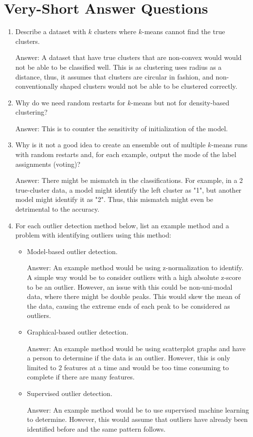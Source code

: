 \documentclass{article}
\def\ans#1{\par\gre{Answer: #1}}
\def\gre#1{{\color{gre}#1}}
\begin{document}
\pagebreak

\section{Very-Short Answer Questions}



\begin{enumerate}
\item Describe a dataset with $k$ clusters where $k$-means cannot find the true clusters.
\ans{A dataset that have true clusters that are non-convex would would not be able to be classified well. This is as clustering uses radius as a distance, thus, it assumes that clusters are circular in fashion, and non-conventionally shaped clusters would not be able to be clustered correctly.}
\item Why do we need random restarts for $k$-means but not for density-based clustering?
\ans{This is to counter the sensitivity of initialization of the model.}
\item Why is it not a good idea to create an ensemble out of multiple $k$-means runs with random restarts and, for each example, output the mode of the label assignments (voting)?
\ans{There might be mismatch in the classifications. For example, in a 2 true-cluster data, a model might identify the left cluster as "1", but another model might identify it as "2". Thus, this mismatch might even be detrimental to the accuracy.}
\item For each outlier detection method below, list an example method and a problem with identifying outliers using this method:
\begin{itemize}
\item Model-based outlier detection.
\ans{An example method would be using z-normalization to identify. A simple way would be to consider outliers with a high absolute z-score to be an outlier. However, an issue with this could be non-uni-modal data, where there might be double peaks. This would skew the mean of the data, causing the extreme ends of each peak to be considered as outliers.}
\item Graphical-based outlier detection.
\ans{An example method would be using scatterplot graphs and have a person to determine if the data is an outlier. However, this is only limited to 2 features at a time and would be too time consuming to complete if there are many features.}
\item Supervised outlier detection.
\ans{An example method would be to use supervised machine learning to determine. However, this would assume that outliers have already been identified before and the same pattern follows.}

\end{itemize}
\end{enumerate}
\end{document}
